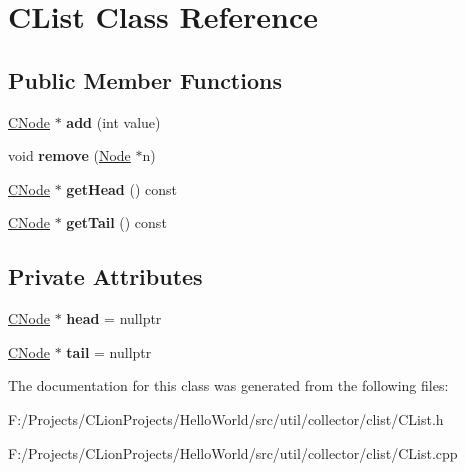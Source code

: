 \hypertarget{class_c_list}{}\section{C\+List Class Reference}
\label{class_c_list}
\subsection*{Public Member Functions}
\begin{DoxyCompactItemize}
\item 
\mbox{\label{class_c_list_af1d62e14c1036806d81e2ed6c3a0473f}} 
\mbox{\hyperlink{class_c_node}{C\+Node}} $\ast$ {\bfseries add} (int value)
\item 
\mbox{\label{class_c_list_a0e713d3c55e6b9902b18beb846e739fb}} 
void {\bfseries remove} (\mbox{\hyperlink{class_node}{Node}} $\ast$n)
\item 
\mbox{\label{class_c_list_a676ed56be2999fc86ca48df0d12c620e}} 
\mbox{\hyperlink{class_c_node}{C\+Node}} $\ast$ {\bfseries get\+Head} () const
\item 
\mbox{\label{class_c_list_afaac3938d8fa72976172d74dfd7254d8}} 
\mbox{\hyperlink{class_c_node}{C\+Node}} $\ast$ {\bfseries get\+Tail} () const
\end{DoxyCompactItemize}
\subsection*{Private Attributes}
\begin{DoxyCompactItemize}
\item 
\mbox{\label{class_c_list_a36894eeba0f1610b1a08187ca751ad83}} 
\mbox{\hyperlink{class_c_node}{C\+Node}} $\ast$ {\bfseries head} = nullptr
\item 
\mbox{\label{class_c_list_a0c914271bfbca52e9367bee34c79fd13}} 
\mbox{\hyperlink{class_c_node}{C\+Node}} $\ast$ {\bfseries tail} = nullptr
\end{DoxyCompactItemize}


The documentation for this class was generated from the following files\+:\begin{DoxyCompactItemize}
\item 
F\+:/\+Projects/\+C\+Lion\+Projects/\+Hello\+World/src/util/collector/clist/C\+List.\+h\item 
F\+:/\+Projects/\+C\+Lion\+Projects/\+Hello\+World/src/util/collector/clist/C\+List.\+cpp\end{DoxyCompactItemize}
